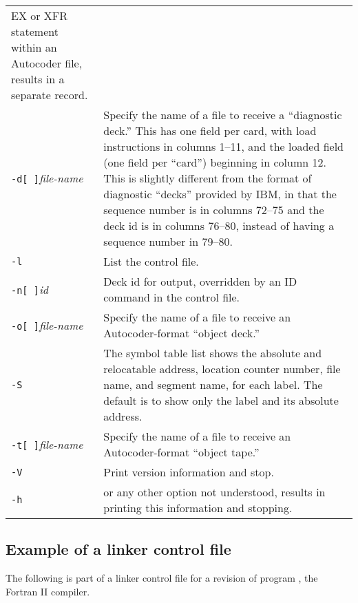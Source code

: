 \documentclass[12pt,twoside]{article}
\begin{document}
\begin{longtable}{lp{4.5in}}
          EX or XFR statement within an Autocoder file, results in a
          separate record. \\
{\tt -d[ ]}\emph{file-name} & Specify the name of a file to receive a
          ``diagnostic deck.''  This has one field per card, with load
          instructions in columns 1--11, and the loaded field (one field
          per ``card'') beginning in column 12.  This is slightly
          different from the format of diagnostic ``decks'' provided by
          IBM, in that the sequence number is in columns 72--75 and the
          deck id is in columns 76--80, instead of having a sequence
          number in 79--80.\\
{\tt -l} & List the control file.\\
{\tt -n[ ]}\emph{id} & Deck id for output, overridden by an ID command in
          the control file.\\
{\tt -o[ ]}\emph{file-name} & Specify the name of a file to receive
          an Autocoder-format ``object deck.''\\
{\tt -S} & The symbol table list shows the absolute and relocatable address,
          location counter number, file name, and segment name, for each
          label.  The default is to show only the label and its absolute
          address. \\
{\tt -t[ ]}\emph{file-name} & Specify the name of a file to receive an
          Autocoder-format ``object tape.'' \\
{\tt -V} & Print version information and stop.\\
{\tt -h} & or any other option not understood, results in printing this
          information and stopping. \\
\end{longtable}

\subsection{Example of a linker control file}

The following is part of a linker control file for a revision of program
, the Fortran II compiler.
\end{document}
